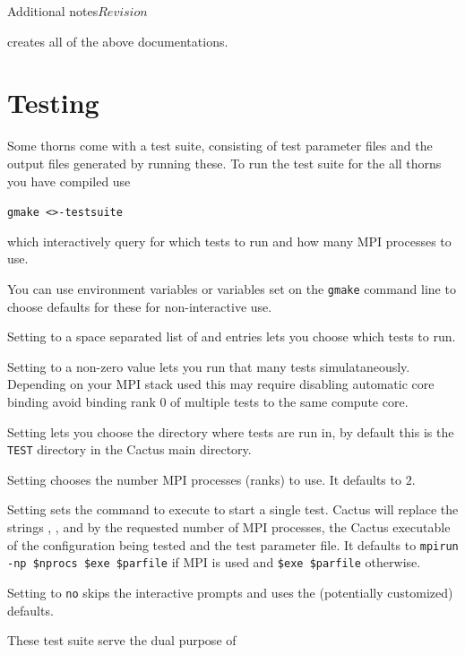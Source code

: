 \begin{cactuspart}{Additional notes}{}{$Revision$}
\begin{Lentry}
\item [\texttt{gmake AllDoc}] creates all of the above documentations.

\end{Lentry}


\section{Testing}
\label{sec:testing}

Some thorns come with a test suite, consisting of test parameter files
and the output files generated by running these. To run the test suite
for the all thorns you have compiled use

\texttt{gmake <>-testsuite}

which interactively query for which tests to run and how many MPI processes
to use.

You can use environment variables or variables set on the \texttt{gmake}
command line to choose defaults for these for non-interactive use.

Setting  to a space separated list of
 and  entries lets you choose which tests to run.

Setting  to a non-zero value lets
you run that many tests simulataneously. Depending on your MPI stack
used this may require disabling automatic core binding avoid binding
rank 0 of multiple tests to the same compute core.

Setting  lets you choose the directory where tests are run
in, by default this is the \texttt{TEST} directory in the Cactus main
directory.

Setting  chooses the number MPI
processes (ranks) to use. It defaults to $2$.

Setting  sets the command to execute to
start a single test. Cactus will replace the strings ,
, and  by the requested number of MPI processes,
the Cactus executable of the configuration being tested and the test
parameter file. It defaults to \texttt{mpirun -np \$nprocs \$exe \$parfile}
if MPI is used and \texttt{\$exe \$parfile} otherwise.

Setting  to \texttt{no} skips the interactive prompts and uses
the (potentially customized) defaults.

These test suite serve the dual purpose of


\end{cactuspart}
